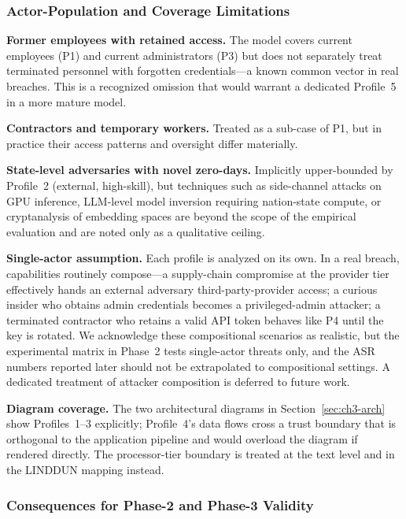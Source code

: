 \subsubsection{Actor-Population and Coverage Limitations}

\begin{limitbox}
\textbf{Former employees with retained access.} The model covers current
employees (P1) and current administrators (P3) but does not separately
treat terminated personnel with forgotten credentials---a known common
vector in real breaches. This is a recognized omission that would warrant
a dedicated Profile~5 in a more mature model.

\textbf{Contractors and temporary workers.} Treated as a sub-case of P1,
but in practice their access patterns and oversight differ materially.

\textbf{State-level adversaries with novel zero-days.} Implicitly
upper-bounded by Profile~2 (external, high-skill), but techniques such as
side-channel attacks on GPU inference, LLM-level model inversion
requiring nation-state compute, or cryptanalysis of embedding spaces are
beyond the scope of the empirical evaluation and are noted only as a
qualitative ceiling.

\textbf{Single-actor assumption.} Each profile is analyzed on its own.
In a real breach, capabilities routinely compose---a supply-chain
compromise at the provider tier effectively hands an external adversary
third-party-provider access; a curious insider who obtains admin
credentials becomes a privileged-admin attacker; a terminated contractor
who retains a valid API token behaves like P4 until the key is rotated.
We acknowledge these compositional scenarios as realistic, but the
experimental matrix in Phase~2 tests single-actor threats only, and the
ASR numbers reported later should not be extrapolated to compositional
settings. A dedicated treatment of attacker composition is deferred to
future work.

\textbf{Diagram coverage.} The two architectural diagrams in Section~\ref{sec:ch3-arch}
show Profiles~1--3 explicitly; Profile~4's data flows cross a trust
boundary that is orthogonal to the application pipeline and would
overload the diagram if rendered directly. The processor-tier boundary
is treated at the text level and in the LINDDUN mapping instead.
\end{limitbox}

\subsubsection{Consequences for Phase-2 and Phase-3 Validity}

